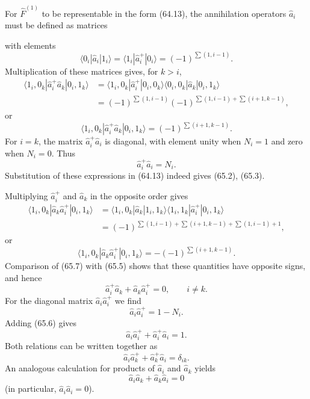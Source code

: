For $\hat F^{(1)}$ to be representable in the form (64.13), the annihilation
operators $\hat a_i$ must be defined as matrices

with elements
\begin{equation}
 \langle0_i|\hat a_i|1_i\rangle
 =\langle1_i|\hat a_i^+|0_i\rangle=(-1)^{\sum(1,i-1)}.
 \tag{65.4}
\end{equation}
Multiplication of these matrices gives, for $k>i$,
\[
 \begin{aligned}
 \langle1_i,0_k|\hat a_i^+\hat a_k|0_i,1_k\rangle
 &=\langle1_i,0_k|\hat a_i^+|0_i,0_k\rangle
   \langle0_i,0_k|\hat a_k|0_i,1_k\rangle\\
 &=(-1)^{\sum(1,i-1)}
   (-1)^{\sum(1,i-1)+\sum(i+1,k-1)},
 \end{aligned}
\]
or
\begin{equation}
 \langle1_i,0_k|\hat a_i^+\hat a_k|0_i,1_k\rangle
 =(-1)^{\sum(i+1,k-1)}.
 \tag{65.5}
\end{equation}
For $i=k$, the matrix $\hat a_i^+\hat a_i$ is diagonal, with element unity
when $N_i=1$ and zero when $N_i=0$. Thus
\begin{equation}
 \hat a_i^+\hat a_i=N_i.
 \tag{65.6}
\end{equation}
Substitution of these expressions in (64.13) indeed gives (65.2), (65.3).

Multiplying $\hat a_i^+$ and $\hat a_k$ in the opposite order gives
\[
 \begin{aligned}
 \langle1_i,0_k|\hat a_k\hat a_i^+|0_i,1_k\rangle
 &=\langle1_i,0_k|\hat a_k|1_i,1_k\rangle
   \langle1_i,1_k|\hat a_i^+|0_i,1_k\rangle\\
 &=(-1)^{\sum(1,i-1)+\sum(i+1,k-1)+\sum(1,i-1)+1},
 \end{aligned}
\]
or
\begin{equation}
 \langle1_i,0_k|\hat a_k\hat a_i^+|0_i,1_k\rangle
 =-(-1)^{\sum(i+1,k-1)}.
 \tag{65.7}
\end{equation}
Comparison of (65.7) with (65.5) shows that these quantities have opposite
signs, and hence
\[
 \hat a_i^+\hat a_k+\hat a_k\hat a_i^+=0,\qquad i\ne k.
\]
For the diagonal matrix $\hat a_i\hat a_i^+$ we find
\begin{equation}
 \hat a_i\hat a_i^+=1-N_i.
 \tag{65.8}
\end{equation}
Adding (65.6) gives
\[
 \hat a_i\hat a_i^++\hat a_i^+\hat a_i=1.
\]
Both relations can be written together as
\begin{equation}
 \hat a_i\hat a_k^++\hat a_k^+\hat a_i=\delta_{ik}.
 \tag{65.9}
\end{equation}
An analogous calculation for products of $\hat a_i$ and $\hat a_k$ yields
\begin{equation}
 \hat a_i\hat a_k+\hat a_k\hat a_i=0
 \tag{65.10}
\end{equation}
(in particular, $\hat a_i\hat a_i=0$).

